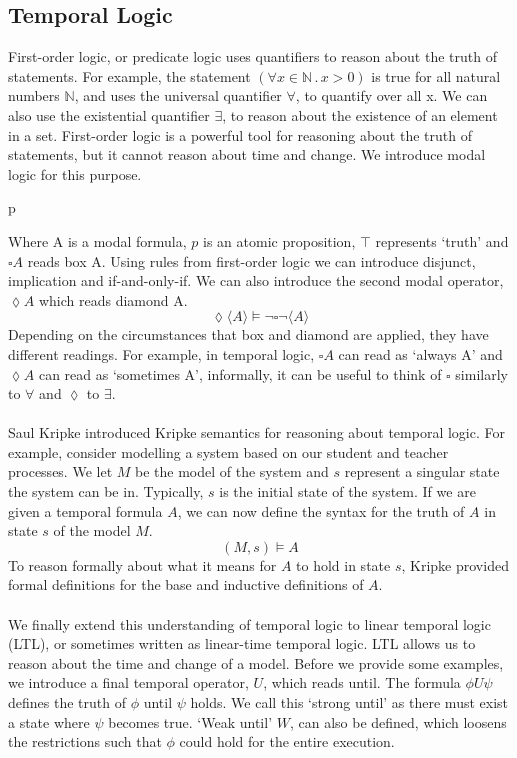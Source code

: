 \subsection{Temporal Logic}
First-order logic, or predicate logic uses quantifiers to reason about the truth of statements. For example, the statement $(\forall x \in \mathbb{N} \,.\, x > 0)$ is true for all natural numbers $\mathbb{N}$, and uses the universal quantifier $\forall$, to quantify over all x. We can also use the existential quantifier $\exists$, to reason about the existence of an element in a set. First-order logic is a powerful tool for reasoning about the truth of statements, but it cannot reason about time and change. We introduce modal logic for this purpose.
\begin{bnf*}
      {p \bnfor \top \bnfor \neg {} \bnfor {} \land {} \bnfor \square {}}\\
\end{bnf*}
Where A is a modal formula, $p$ is an atomic proposition, $\top$ represents `truth' and $\square A$ reads box A. Using rules from first-order logic we can introduce disjunct, implication and if-and-only-if. We can also introduce the second modal operator, $\lozenge A$ which reads diamond A.
\[
\lozenge \langle A \rangle \models \neg \square \neg \langle A \rangle
\]
Depending on the circumstances that box and diamond are applied, they have different readings. For example, in temporal logic, $\square A$ can read as `always A' and $\lozenge A$ can read as `sometimes A', informally, it can be useful to think of $\square$ similarly to $\forall$ and $\lozenge$ to $\exists$.
\\ \\
Saul Kripke introduced Kripke semantics \cite{kripke} for reasoning about temporal logic. For example, consider modelling a system based on our student and teacher processes. We let $M$ be the model of the system and $s$ represent a singular state the system can be in. Typically, $s$ is the initial state of the system. If we are given a temporal formula $A$, we can now define the syntax for the truth of $A$ in state $s$ of the model $M$.
\[
(M, s) \models A
\]
To reason formally about what it means for $A$ to hold in state $s$, Kripke provided formal definitions for the base and inductive definitions of $A$.
\\ \\
We finally extend this understanding of temporal logic to linear temporal logic (LTL), or sometimes written as linear-time temporal logic. LTL allows us to reason about the time and change of a model. Before we provide some examples, we introduce a final temporal operator, $U$, which reads until. The formula $\phi U \psi$ defines the truth of $\phi$ until $\psi$ holds. We call this `strong until' as there must exist a state where $\psi$ becomes true. `Weak until' $W$, can also be defined, which loosens the restrictions such that $\phi$ could hold for the entire execution.
